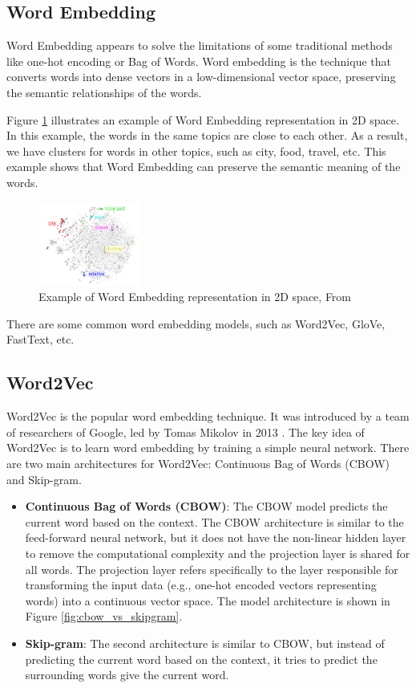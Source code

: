\subsection{Word Embedding}
Word Embedding appears to solve the limitations of some traditional methods like one-hot encoding or Bag of Words. Word embedding is the technique that converts words into dense vectors in a low-dimensional vector space, preserving the semantic relationships of the words.

Figure \ref{fig:word_embedding} illustrates an example of Word Embedding representation in 2D space. In this example, the words in the same topics are close to each other. As a result, we have clusters for words in other topics, such as city, food, travel, etc. This example shows that Word Embedding can preserve the semantic meaning of the words.

\begin{figure}[ht]
    \centering
    \includegraphics[width=0.3\textwidth]{Images/5.Theoretical_Background/word_embeddings_example.png}
    \caption{Example of Word Embedding representation in 2D space, From \cite{word-embedding-example}}
    \label{fig:word_embedding}
\end{figure}

There are some common word embedding models, such as Word2Vec, GloVe, FastText, etc. 

\subsection{Word2Vec}
Word2Vec is the popular word embedding technique. It was introduced by a team of researchers of Google, led by Tomas Mikolov in 2013 \cite{word2vec-paper-publication}. The key idea of Word2Vec is to learn word embedding by training a simple neural network. There are two main architectures for Word2Vec: Continuous Bag of Words (CBOW) and Skip-gram.
\begin{itemize}
    \item \textbf{Continuous Bag of Words (CBOW)}: The CBOW model predicts the current word based on the context. The CBOW architecture is similar to the feed-forward neural network, but it does not have the non-linear hidden layer to remove the computational complexity and the projection layer is shared for all words. The projection layer refers specifically to the layer responsible for transforming the input data (e.g., one-hot encoded vectors representing words) into a continuous vector space. The model architecture is shown in Figure \ref{fig:cbow_vs_skipgram}. 
    \item \textbf{Skip-gram}: The second architecture is similar to CBOW, but instead of predicting the current word based on the context, it tries to predict the surrounding words give the current word.
\end{itemize}

